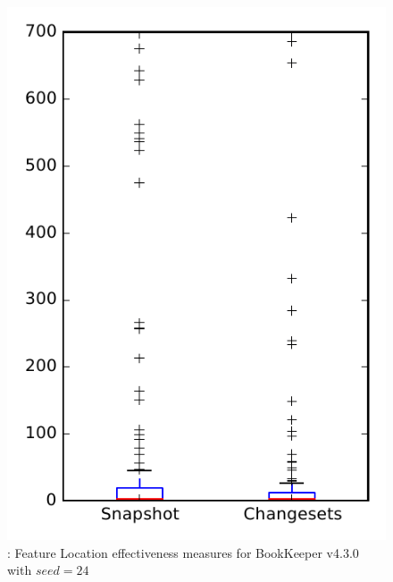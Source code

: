 
\begin{figure}
\centering
\includegraphics[height=0.4\textheight]{figures/flt_seed/rq1_bookkeeper_24}
\caption{\rone: Feature Location effectiveness measures for BookKeeper v4.3.0 with $seed=24$}
\label{fig:flt_seed:rq1:bookkeeper}
\end{figure}
